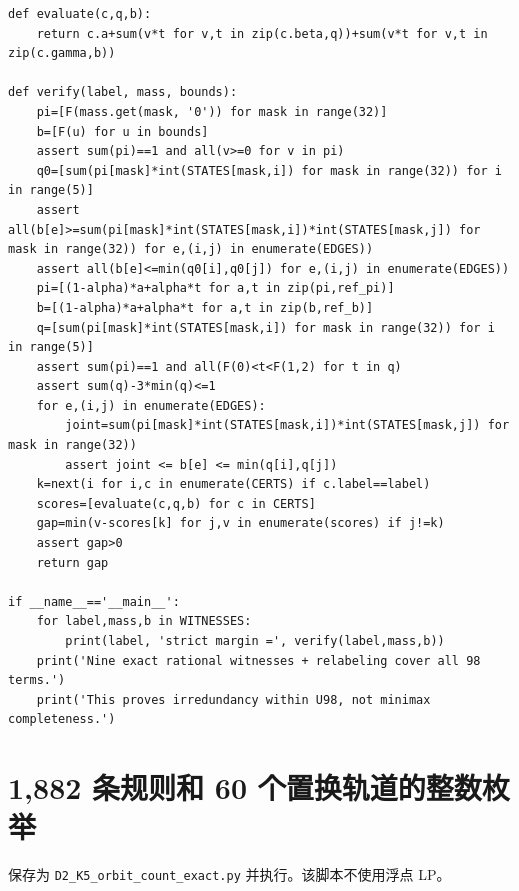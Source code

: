 \documentclass[11pt,a4paper]{ctexart}
\theoremstyle{definition}
\begin{document}
\begin{lstlisting}
def evaluate(c,q,b):
    return c.a+sum(v*t for v,t in zip(c.beta,q))+sum(v*t for v,t in zip(c.gamma,b))

def verify(label, mass, bounds):
    pi=[F(mass.get(mask, '0')) for mask in range(32)]
    b=[F(u) for u in bounds]
    assert sum(pi)==1 and all(v>=0 for v in pi)
    q0=[sum(pi[mask]*int(STATES[mask,i]) for mask in range(32)) for i in range(5)]
    assert all(b[e]>=sum(pi[mask]*int(STATES[mask,i])*int(STATES[mask,j]) for mask in range(32)) for e,(i,j) in enumerate(EDGES))
    assert all(b[e]<=min(q0[i],q0[j]) for e,(i,j) in enumerate(EDGES))
    pi=[(1-alpha)*a+alpha*t for a,t in zip(pi,ref_pi)]
    b=[(1-alpha)*a+alpha*t for a,t in zip(b,ref_b)]
    q=[sum(pi[mask]*int(STATES[mask,i]) for mask in range(32)) for i in range(5)]
    assert sum(pi)==1 and all(F(0)<t<F(1,2) for t in q)
    assert sum(q)-3*min(q)<=1
    for e,(i,j) in enumerate(EDGES):
        joint=sum(pi[mask]*int(STATES[mask,i])*int(STATES[mask,j]) for mask in range(32))
        assert joint <= b[e] <= min(q[i],q[j])
    k=next(i for i,c in enumerate(CERTS) if c.label==label)
    scores=[evaluate(c,q,b) for c in CERTS]
    gap=min(v-scores[k] for j,v in enumerate(scores) if j!=k)
    assert gap>0
    return gap

if __name__=='__main__':
    for label,mass,b in WITNESSES:
        print(label, 'strict margin =', verify(label,mass,b))
    print('Nine exact rational witnesses + relabeling cover all 98 terms.')
    print('This proves irredundancy within U98, not minimax completeness.')
\end{lstlisting}
\section{1,882 条规则和 60 个置换轨道的整数枚举}
\noindent 保存为 \texttt{D2\_K5\_orbit\_count\_exact.py} 并执行。该脚本不使用浮点 LP。
\end{document}
